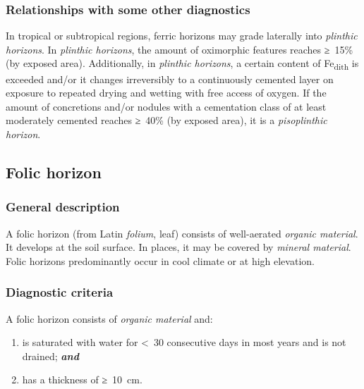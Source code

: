 \documentclass[
  letterpaper,
  DIV=11,
  numbers=noendperiod]{scrreprt}
\begin{document}
\hypertarget{relationships-with-some-other-diagnostics-10}{%
\subsubsection{Relationships with some other
diagnostics}\label{relationships-with-some-other-diagnostics-10}}

In tropical or subtropical regions, ferric horizons may grade laterally
into \emph{plinthic horizons}. In \emph{plinthic horizons}, the amount
of oximorphic features reaches ≥~15\% (by exposed area). Additionally,
in \emph{plinthic horizons}, a certain content of Fe\textsubscript{dith}
is exceeded and/or it changes irreversibly to a continuously cemented
layer on exposure to repeated drying and wetting with free access of
oxygen. If the amount of concretions and/or nodules with a cementation
class of at least moderately cemented reaches ≥~40\% (by exposed area),
it is a \emph{pisoplinthic horizon}.

\hypertarget{folic-horizon}{%
\subsection{Folic horizon}\label{folic-horizon}}

\hypertarget{general-description-11}{%
\subsubsection{General description}\label{general-description-11}}

A folic horizon (from Latin \emph{folium}, leaf) consists of
well-aerated \emph{organic material}. It develops at the soil surface.
In places, it may be covered by \emph{mineral material}. Folic horizons
predominantly occur in cool climate or at high elevation.

\hypertarget{diagnostic-criteria-11}{%
\subsubsection{Diagnostic criteria}\label{diagnostic-criteria-11}}

A folic horizon consists of \emph{organic material} and:

\begin{enumerate}
\def\labelenumi{\arabic{enumi}.}
\item
  is saturated with water for \textless~30 consecutive days in most
  years and is not drained; \textbf{\emph{and}}
\item
  has a thickness of ≥~10~cm.
\end{enumerate}
\end{document}
